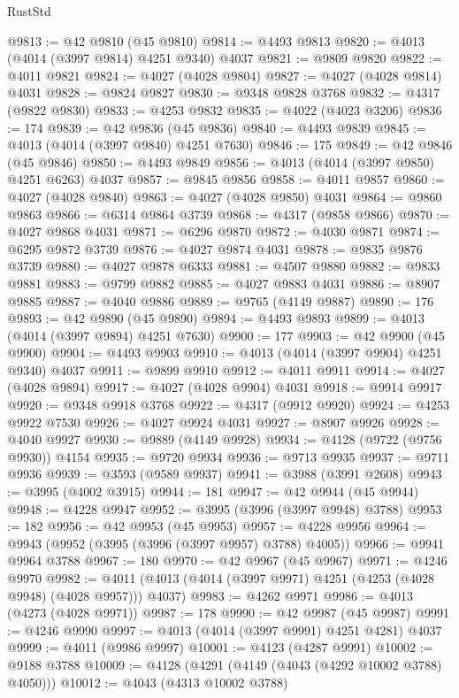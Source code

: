 \begin{lexlean}{RustStd}
\begin{coremodule}
@9813 := @42 @9810 (@45 @9810)
@9814 := @4493 @9813
@9820 := @4013 (@4014 (@3997 @9814) @4251 @9340) @4037
@9821 := @9809 @9820
@9822 := @4011 @9821
@9824 := @4027 (@4028 @9804)
@9827 := @4027 (@4028 @9814) @4031
@9828 := @9824 @9827
@9830 := @9348 @9828 @3768
@9832 := @4317 (@9822 @9830)
@9833 := @4253 @9832
@9835 := @4022 (@4023 @3206)
@9836 := 174
@9839 := @42 @9836 (@45 @9836)
@9840 := @4493 @9839
@9845 := @4013 (@4014 (@3997 @9840) @4251 @7630)
@9846 := 175
@9849 := @42 @9846 (@45 @9846)
@9850 := @4493 @9849
@9856 := @4013 (@4014 (@3997 @9850) @4251 @6263) @4037
@9857 := @9845 @9856
@9858 := @4011 @9857
@9860 := @4027 (@4028 @9840)
@9863 := @4027 (@4028 @9850) @4031
@9864 := @9860 @9863
@9866 := @6314 @9864 @3739
@9868 := @4317 (@9858 @9866)
@9870 := @4027 @9868 @4031
@9871 := @6296 @9870
@9872 := @4030 @9871
@9874 := @6295 @9872 @3739
@9876 := @4027 @9874 @4031
@9878 := @9835 @9876 @3739
@9880 := @4027 @9878 @6333
@9881 := @4507 @9880
@9882 := @9833 @9881
@9883 := @9799 @9882
@9885 := @4027 @9883 @4031
@9886 := @8907 @9885
@9887 := @4040 @9886
@9889 := @9765 (@4149 @9887)
@9890 := 176
@9893 := @42 @9890 (@45 @9890)
@9894 := @4493 @9893
@9899 := @4013 (@4014 (@3997 @9894) @4251 @7630)
@9900 := 177
@9903 := @42 @9900 (@45 @9900)
@9904 := @4493 @9903
@9910 := @4013 (@4014 (@3997 @9904) @4251 @9340) @4037
@9911 := @9899 @9910
@9912 := @4011 @9911
@9914 := @4027 (@4028 @9894)
@9917 := @4027 (@4028 @9904) @4031
@9918 := @9914 @9917
@9920 := @9348 @9918 @3768
@9922 := @4317 (@9912 @9920)
@9924 := @4253 @9922 @7530
@9926 := @4027 @9924 @4031
@9927 := @8907 @9926
@9928 := @4040 @9927
@9930 := @9889 (@4149 @9928)
@9934 := @4128 (@9722 (@9756 @9930)) @4154
@9935 := @9720 @9934
@9936 := @9713 @9935
@9937 := @9711 @9936
@9939 := @3593 (@9589 @9937)
@9941 := @3988 (@3991 @2608)
@9943 := @3995 (@4002 @3915)
@9944 := 181
@9947 := @42 @9944 (@45 @9944)
@9948 := @4228 @9947
@9952 := @3995 (@3996 (@3997 @9948) @3788)
@9953 := 182
@9956 := @42 @9953 (@45 @9953)
@9957 := @4228 @9956
@9964 := @9943 (@9952 (@3995 (@3996 (@3997 @9957) @3788) @4005))
@9966 := @9941 @9964 @3788
@9967 := 180
@9970 := @42 @9967 (@45 @9967)
@9971 := @4246 @9970
@9982 := @4011 (@4013 (@4014 (@3997 @9971) @4251 (@4253 (@4028 @9948) (@4028 @9957))) @4037)
@9983 := @4262 @9971
@9986 := @4013 (@4273 (@4028 @9971))
@9987 := 178
@9990 := @42 @9987 (@45 @9987)
@9991 := @4246 @9990
@9997 := @4013 (@4014 (@3997 @9991) @4251 @4281) @4037
@9999 := @4011 (@9986 @9997)
@10001 := @4123 (@4287 @9991)
@10002 := @9188 @3788
@10009 := @4128 (@4291 (@4149 (@4043 (@4292 @10002 @3788) @4050)))
@10012 := @4043 (@4313 @10002 @3788)

\end{coremodule}
\end{lexlean}
